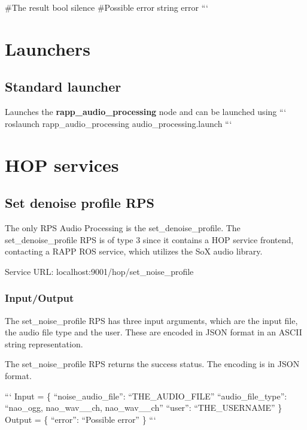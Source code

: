 \#\-The result bool silence \#\-Possible error string error ```

\section*{Launchers}

\subsection*{Standard launcher}

Launches the {\bfseries rapp\-\_\-audio\-\_\-processing} node and can be launched using ``` roslaunch rapp\-\_\-audio\-\_\-processing audio\-\_\-processing.\-launch ```

\section*{H\-O\-P services}

\subsection*{Set denoise profile R\-P\-S}

The only R\-P\-S Audio Processing is the set\-\_\-denoise\-\_\-profile. The set\-\_\-denoise\-\_\-profile R\-P\-S is of type 3 since it contains a H\-O\-P service frontend, contacting a R\-A\-P\-P R\-O\-S service, which utilizes the So\-X audio library.

Service U\-R\-L\-: {\ttfamily localhost\-:9001/hop/set\-\_\-noise\-\_\-profile}

\subsubsection*{Input/\-Output}

The set\-\_\-noise\-\_\-profile R\-P\-S has three input arguments, which are the input file, the audio file type and the user. These are encoded in J\-S\-O\-N format in an A\-S\-C\-I\-I string representation.

The set\-\_\-noise\-\_\-profile R\-P\-S returns the success status. The encoding is in J\-S\-O\-N format.

``` Input = \{ “noise\-\_\-audio\-\_\-file”\-: “\-T\-H\-E\-\_\-\-A\-U\-D\-I\-O\-\_\-\-F\-I\-L\-E” “audio\-\_\-file\-\_\-type”\-: “nao\-\_\-ogg, nao\-\_\-wav\-\_\-\_\-ch, nao\-\_\-wav\-\_\-\_\-ch” “user”\-: “\-T\-H\-E\-\_\-\-U\-S\-E\-R\-N\-A\-M\-E” \} {\ttfamily  } Output = \{ “error”\-: “\-Possible error” \} ``` 